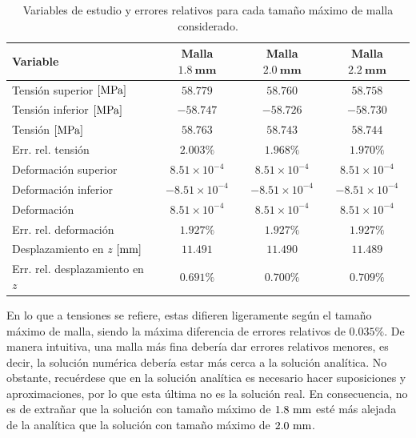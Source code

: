 \begin{table}[H]
    \centering
    \begin{tabular}{lccc}
        \toprule[0.50mm]
        \textbf{Variable} 
        & \textbf{Malla $\mathbf{1.8 \ mm}$} 
        & \textbf{Malla $\mathbf{2.0 \ mm}$} 
        & \textbf{Malla $\mathbf{2.2 \ mm}$} \\
        \midrule[0.25mm]
        Tensión superior $[\mega\pascal]$ & 
        \phantom{+}$58.779$ & 
        \phantom{+}$58.760$ & 
        \phantom{+}$58.758$ \\
        Tensión inferior \phantom{r}$[\mega\pascal]$ & 
        $-58.747$ & 
        $-58.726$ & 
        $-58.730$ \\
        Tensión \phantom{superior }$[\mega\pascal]$ & 
        \phantom{+}$58.763$ & 
        \phantom{+}$58.743$ & 
        \phantom{+}$58.744$ \\
        Err. rel. tensión & 
        \phantom{+}$2.003 \%$ & 
        \phantom{+}$1.968 \%$ & 
        \phantom{+}$1.970 \%$ \\
        \midrule[0.25mm]
        Deformación superior & 
        \phantom{+}$8.51 \times 10^{-4}$ & \phantom{+}$8.51 \times 10^{-4}$ & \phantom{+}$8.51 \times 10^{-4}$ \\
        Deformación inferior & 
        $-8.51 \times 10^{-4}$ & $-8.51 \times 10^{-4}$ & $-8.51 \times 10^{-4}$ \\
        Deformación & 
        \phantom{+}$8.51 \times 10^{-4}$ & \phantom{+}$8.51 \times 10^{-4}$ & \phantom{+}$8.51 \times 10^{-4}$ \\
        Err. rel. deformación & 
        $1.927 \%$ & $1.927 \%$ & $1.927 \%$ \\
        \midrule[0.25mm]
        Desplazamiento en $z$ $[\milli\meter]$ & 
        $11.491$ & $11.490$ & $11.489$ \\
        Err. rel. desplazamiento en $z$  & 
        $0.691 \%$ & $0.700 \%$ & $0.709 \%$ \\
        \bottomrule[0.50mm]
    \end{tabular}
    \caption{Variables de estudio y errores relativos para cada tamaño máximo de malla considerado.}
    \label{tab:estudio_malla_error_relativo}
\end{table}

\noindent
En lo que a tensiones se refiere, estas difieren ligeramente según el tamaño máximo de malla, siendo la máxima diferencia de errores relativos de $0.035 \%$. De manera intuitiva, una malla más fina debería dar errores relativos menores, es decir, la solución numérica debería estar más cerca a la solución analítica. No obstante, recuérdese que en la solución analítica es necesario hacer suposiciones y aproximaciones, por lo que esta última no es la solución real. En consecuencia, no es de extrañar que la solución con tamaño máximo de $1.8 \ \milli\meter$ esté más alejada de la analítica que la solución con tamaño máximo de $2.0 \ \milli\meter$. 

